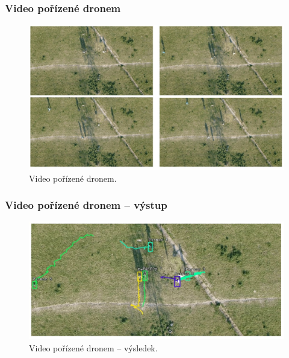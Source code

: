 \documentclass[11pt,xcolor=pdflatex]{beamer}
\begin{document}

\begin{frame}\frametitle{Video pořízené dronem}
    
    \begin{figure}[H]
        \centering
        \includegraphics[width=.99\linewidth]{images/test2-input.jpg}
        \caption{Video pořízené dronem.}
    \end{figure}
    
\end{frame}


\begin{frame}\frametitle{Video pořízené dronem -- výstup}
    
    \begin{figure}[H]
        \centering
        \includegraphics[width=.99\linewidth]{images/test2-output.jpg}
        \caption{Video pořízené dronem -- výsledek.}
    \end{figure}
    
\end{frame}

\end{document}
